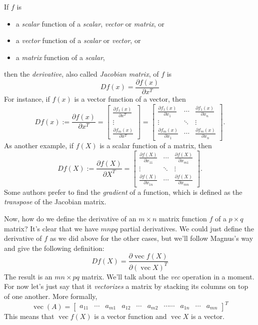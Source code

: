 \documentclass[a4paper,12pt]{article}
\begin{document}
If $f$ is
\begin{itemize}
      \item a \emph{scalar} function of a \emph{scalar}, \emph{vector} or \emph{matrix}, or
      \item a \emph{vector} function of a \emph{scalar} or \emph{vector}, or
      \item a \emph{matrix} function of a \emph{scalar},
\end{itemize}
then the \emph{derivative}, also called \emph{Jacobian matrix}, of $f$ is
$$ Df(x) = \frac{\partial f(x)}{\partial x^T}
$$ For instance, if $f(x)$ is a vector function of a vector, then
$$
Df(x) :=\frac{\partial f(x)}{\partial x^T} =
\begin{bmatrix}
\frac{\partial f_1(x)}{\partial x^T} \\
\vdots \\
\frac{\partial f_m(x)}{\partial x^T}
\end{bmatrix} =
\begin{bmatrix}
\frac{\partial f_1(x)}{\partial x_1} & \cdots & \frac{\partial f_1(x)}{\partial x_n} \\
\vdots & \ddots & \vdots \\
\frac{\partial f_m(x)}{\partial x_1} & \cdots & \frac{\partial f_m(x)}{\partial x_n}
\end{bmatrix}.
$$ As another example, if $f(X)$ is a scalar function of a matrix, then
$$
Df(X) :=\frac{\partial f(X)}{\partial X^T} =
\begin{bmatrix}
\frac{\partial f(X)}{\partial x_{11}} & \cdots & \frac{\partial f(X)}{\partial x_{m1}} \\
\vdots & \ddots & \vdots \\
\frac{\partial f(X)}{\partial x_{1n}} & \cdots & \frac{\partial f(X)}{\partial x_{mn}}
\end{bmatrix}.
$$
Some authors prefer to find the \emph{gradient} of a function, which is defined as the \emph{transpose} of the Jacobian matrix.

Now, how do we define the derivative of an $m\times n$ matrix function $f$ of a $p\times q$ matrix? It's clear that we have $mnpq$ partial derivatives. We could just define the derivative of $f$ as we did above for the other cases, but we'll follow Magnus's way\cite{ABA05, MAG99} and give the following definition:
$$
Df(X) = \frac{\partial \operatorname{vec} f(X)}{\partial(\operatorname{vec} X)^T}
$$
The result is an $mn\times pq$ matrix. We'll talk about the \emph{vec} operation in a moment. For now let's just say that it \emph{vectorizes} a matrix by stacking its columns on top of one another. More formally,
$$
\operatorname{vec}(A) =
\begin{bmatrix}
a_{11} & \cdots & a_{m1} & a_{12} & \cdots & a_{m2} & \cdots\cdots & a_{1n} & \cdots & a_{mn}
\end{bmatrix}^T
$$ This means that $\operatorname{vec} f(X)$ is a vector function and $
\operatorname{vec} X$ is a vector.
\end{document}
